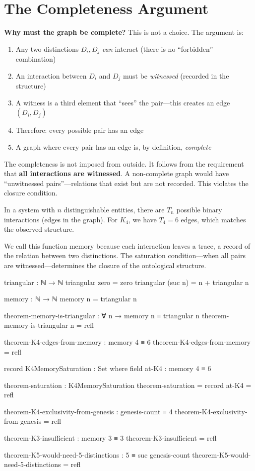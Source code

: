 \documentclass[11pt,a4paper]{book}
\def\texttt#1{#1}%
\begin{document}
\section{The Completeness Argument}

\textbf{Why must the graph be complete?} This is not a choice. The argument is:
\begin{enumerate}
\item Any two distinctions $D_i, D_j$ \emph{can} interact (there is no ``forbidden'' combination)
\item An interaction between $D_i$ and $D_j$ must be \emph{witnessed} (recorded in the structure)
\item A witness is a third element that ``sees'' the pair---this creates an edge $(D_i, D_j)$
\item Therefore: every possible pair has an edge
\item A graph where every pair has an edge is, by definition, \emph{complete}
\end{enumerate}

The completeness is not imposed from outside. It follows from the requirement that 
\textbf{all interactions are witnessed}. A non-complete graph would have ``unwitnessed pairs''---relations 
that exist but are not recorded. This violates the closure condition.

In a system with $n$ distinguishable entities, there are $T_n$ possible binary interactions (edges in the graph).
For $K_4$, we have $T_4 = 6$ edges, which matches the observed structure.

We call this function \texttt{memory} because each interaction leaves a trace, a record of the relation between two distinctions.
The saturation condition---when all pairs are witnessed---determines the closure of the ontological structure.

\begin{code}
triangular : ℕ → ℕ
triangular zero = zero
triangular (suc n) = n + triangular n

memory : ℕ → ℕ
memory n = triangular n

theorem-memory-is-triangular : ∀ n → memory n ≡ triangular n
theorem-memory-is-triangular n = refl

theorem-K4-edges-from-memory : memory 4 ≡ 6
theorem-K4-edges-from-memory = refl

record K4MemorySaturation : Set where
  field
    at-K4 : memory 4 ≡ 6

theorem-saturation : K4MemorySaturation
theorem-saturation = record { at-K4 = refl }

theorem-K4-exclusivity-from-genesis : genesis-count ≡ 4
theorem-K4-exclusivity-from-genesis = refl

theorem-K3-insufficient : memory 3 ≡ 3
theorem-K3-insufficient = refl

theorem-K5-would-need-5-distinctions : 5 ≡ suc genesis-count
theorem-K5-would-need-5-distinctions = refl
\end{code}
\end{document}
